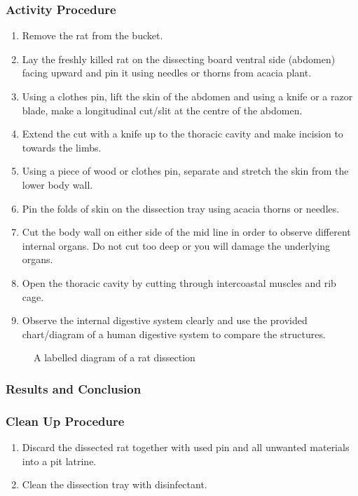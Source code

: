 \subsubsection*{Activity Procedure}
\begin{enumerate}
\item{Remove the rat from the bucket.}
\item{Lay the freshly killed rat on the dissecting board ventral side (abdomen) facing upward and pin it using needles or thorns from acacia plant.}
\item{Using a clothes pin, lift the skin of the abdomen and using a knife or a razor blade, make a longitudinal cut/slit at the centre of the abdomen.}
\item{Extend the cut with a knife up to the thoracic cavity and make incision to towards the limbs.}
\item{Using a piece of wood or clothes pin, separate and stretch the skin from the lower body wall.}
\item{Pin the folds of skin on the dissection tray using acacia thorns or needles.}
\item{Cut the body wall on either side of the mid line in order to observe different internal organs. Do not cut too deep or you will damage the underlying organs.}
\item{Open the thoracic cavity by cutting through intercoastal muscles and rib cage.}
\item{Observe the internal digestive system clearly and use the provided chart/diagram of a human digestive system to compare the structures.}
\end{enumerate}

\begin{figure}[h]
\begin{center}
\def\svgwidth{10cm}

\caption{A labelled diagram of a rat dissection}
\label{fig:rat-dissection}
\end{center}
\end{figure}

\subsubsection*{Results and Conclusion}


\subsubsection*{Clean Up Procedure}
\begin{enumerate}
\item{Discard the dissected rat together with used pin and all unwanted materials into a pit latrine.}
\item{Clean the dissection tray with disinfectant.}
\end{enumerate}

